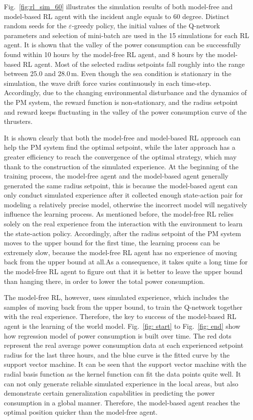 \begin{sloppypar}
Fig.~\ref{fig:rl_sim_60} illustrates the simulation results of both model-free and model-based RL agent with the incident angle equals to 60 degree. Distinct random seeds for the $\varepsilon$-greedy policy, the initial values of the Q-network parameters and selection of mini-batch are used in the 15 simulations for each RL agent. It is shown that the valley of the power consumption can be successfully found within 10 hours by the model-free RL agent, and 8 hours by the model-based RL agent. Most of the selected radius setpoints fall roughly into the range between 25.0 and 28.0$\,$m. Even though the sea condition is stationary in the simulation, the wave drift force varies continuously in each time-step. Accordingly, due to the changing environmental disturbance and the dynamics of the PM system, the reward function is non-stationary, and the radius setpoint and reward keeps fluctuating in the valley of the power consumption curve of the thrusters.

It is shown clearly that both the model-free and model-based RL approach can help the PM system find the optimal setpoint, while the later approach has a greater efficiency to reach the convergence of the optimal strategy, which may thank to the construction of the simulated experience. At the beginning of the training process, the model-free agent and the model-based agent generally generated the same radius setpoint, this is because the model-based agent can only conduct simulated experience after it collected enough state-action pair for modeling a relatively precise model, otherwise the incorrect model will negatively influence the learning process.  As mentioned before, the model-free RL relies solely on the real experience from the interaction with the environment to learn the state-action policy. Accordingly,
after the radius setpoint of the PM system moves to the upper bound for the first time, the learning process can be extremely slow, because the model-free RL agent has no experience of moving back from the upper bound at all.As a consequence, it takes quite a long time for the model-free RL agent to figure out that it is better to leave the upper bound than hanging there, in order to lower the total power consumption.

The model-free RL, however, uses simulated experience, which includes the samples of moving back from the upper bound, to train the Q-network together with the real experience. Therefore, the key to success of the model-based RL agent is the learning of the world model. Fig.~\ref{fig: start} to Fig.~\ref{fig: end} show how regression model of power consumption is built over time. The red dots represent the real average power consumption data at each experienced setpoint radius for the last three hours, and the blue curve is the fitted curve by the support vector machine. It can be seen that the support vector machine with the radial basis function as the kernel function can fit the data points quite well. It can not only generate reliable simulated experience in the local areas, but also demonstrate certain generalization capabilities in predicting
the power consumption in a global manner. Therefore, the model-based agent reaches the optimal position quicker than the model-free agent.


\end{sloppypar}
